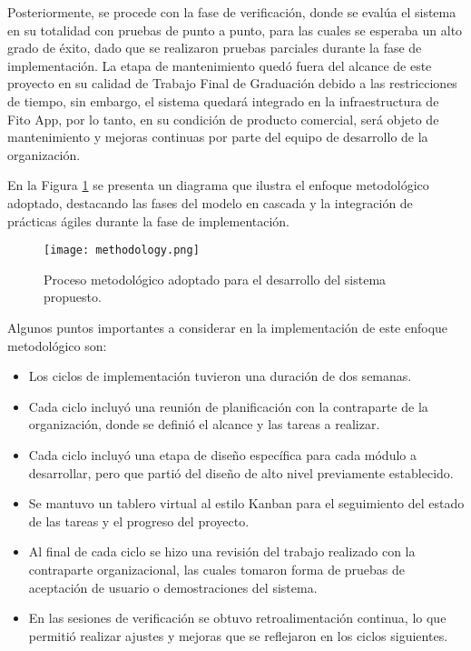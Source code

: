 Posteriormente, se procede con la fase de verificación, donde se evalúa el sistema en su totalidad con pruebas de punto a punto, para las cuales se esperaba un alto grado de éxito, dado que se realizaron pruebas parciales durante la fase de implementación. La etapa de mantenimiento quedó fuera del alcance de este proyecto en su calidad de Trabajo Final de Graduación debido a las restricciones de tiempo, sin embargo, el sistema quedará integrado en la infraestructura de Fito App, por lo tanto, en su condición de producto comercial, será objeto de mantenimiento y mejoras continuas por parte del equipo de desarrollo de la organización.

En la Figura \ref{fig:metodologia} se presenta un diagrama que ilustra el enfoque metodológico adoptado, destacando las fases del modelo en cascada y la integración de prácticas ágiles durante la fase de implementación.

\begin{figure}[H]
    \centering
    \texttt{[image: methodology.png]}
    \caption{Proceso metodológico adoptado para el desarrollo del sistema propuesto.}
    \label{fig:metodologia}
\end{figure}

Algunos puntos importantes a considerar en la implementación de este enfoque metodológico son:
\begin{itemize}
    \item Los ciclos de implementación tuvieron una duración de dos semanas.
    \item Cada ciclo incluyó una reunión de planificación con la contraparte de la organización, donde se definió el alcance y las tareas a realizar.
    \item Cada ciclo incluyó una etapa de diseño específica para cada módulo a desarrollar, pero que partió del diseño de alto nivel previamente establecido.
    \item Se mantuvo un tablero virtual al estilo Kanban para el seguimiento del estado de las tareas y el progreso del proyecto.
    \item Al final de cada ciclo se hizo una revisión del trabajo realizado con la contraparte organizacional, las cuales tomaron forma de pruebas de aceptación de usuario o demostraciones del sistema.
    \item En las sesiones de verificación se obtuvo retroalimentación continua, lo que permitió realizar ajustes y mejoras que se reflejaron en los ciclos siguientes.
\end{itemize}

